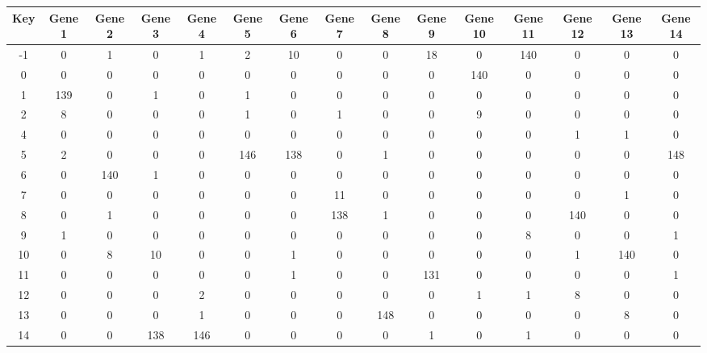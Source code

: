 \begin{tabular}{|c|c|c|c|c|c|c|c|c|c|c|c|c|c|c|}
\hline
Key & Gene 1 & Gene 2 & Gene 3 & Gene 4 & Gene 5 & Gene 6 & Gene 7 & Gene 8 & Gene 9 & Gene 10 & Gene 11 & Gene 12 & Gene 13 & Gene 14 \\
\hline
-1 & 0 & 1 & 0 & 1 & 2 & 10 & 0 & 0 & 18 & 0 & 140 & 0 & 0 & 0 \\
0 & 0 & 0 & 0 & 0 & 0 & 0 & 0 & 0 & 0 & 140 & 0 & 0 & 0 & 0 \\
1 & 139 & 0 & 1 & 0 & 1 & 0 & 0 & 0 & 0 & 0 & 0 & 0 & 0 & 0 \\
2 & 8 & 0 & 0 & 0 & 1 & 0 & 1 & 0 & 0 & 9 & 0 & 0 & 0 & 0 \\
4 & 0 & 0 & 0 & 0 & 0 & 0 & 0 & 0 & 0 & 0 & 0 & 1 & 1 & 0 \\
5 & 2 & 0 & 0 & 0 & 146 & 138 & 0 & 1 & 0 & 0 & 0 & 0 & 0 & 148 \\
6 & 0 & 140 & 1 & 0 & 0 & 0 & 0 & 0 & 0 & 0 & 0 & 0 & 0 & 0 \\
7 & 0 & 0 & 0 & 0 & 0 & 0 & 11 & 0 & 0 & 0 & 0 & 0 & 1 & 0 \\
8 & 0 & 1 & 0 & 0 & 0 & 0 & 138 & 1 & 0 & 0 & 0 & 140 & 0 & 0 \\
9 & 1 & 0 & 0 & 0 & 0 & 0 & 0 & 0 & 0 & 0 & 8 & 0 & 0 & 1 \\
10 & 0 & 8 & 10 & 0 & 0 & 1 & 0 & 0 & 0 & 0 & 0 & 1 & 140 & 0 \\
11 & 0 & 0 & 0 & 0 & 0 & 1 & 0 & 0 & 131 & 0 & 0 & 0 & 0 & 1 \\
12 & 0 & 0 & 0 & 2 & 0 & 0 & 0 & 0 & 0 & 1 & 1 & 8 & 0 & 0 \\
13 & 0 & 0 & 0 & 1 & 0 & 0 & 0 & 148 & 0 & 0 & 0 & 0 & 8 & 0 \\
14 & 0 & 0 & 138 & 146 & 0 & 0 & 0 & 0 & 1 & 0 & 1 & 0 & 0 & 0 \\
\hline
\end{tabular}